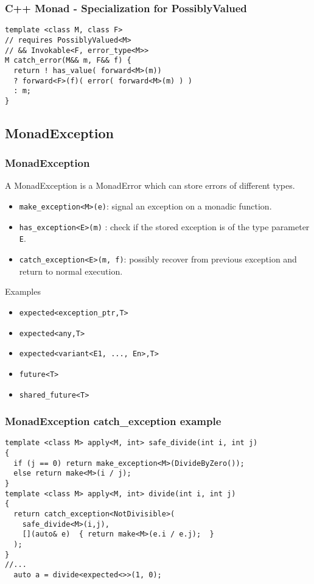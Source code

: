 \documentclass[xcolor=dvipsnames]{beamer}
\newcommand{\cpp}[1]{\lstinline{#1}}
\begin{document}
\begin{frame}[fragile]
\frametitle{C++ Monad - Specialization for PossiblyValued}
       
\begin{lstlisting}
template <class M, class F>
// requires PossiblyValued<M> 
// && Invokable<F, error_type<M>>
M catch_error(M&& m, F&& f) {
  return ! has_value( forward<M>(m))
  ? forward<F>(f)( error( forward<M>(m) ) )
  : m;
}
\end{lstlisting}
         
\end{frame}
\subsection{MonadException}
\begin{frame}[fragile]
\frametitle{MonadException}

A MonadException is a MonadError which can store errors of different types.

\begin{itemize}
  \item \cpp{make_exception<M>(e)}: signal an exception on a monadic function.
  \item \cpp{has_exception<E>(m)} : check if the stored exception is of the type parameter \cpp{E}.
  \item \cpp{catch_exception<E>(m, f)}: possibly recover from previous exception and return to normal execution.
\end{itemize}

Examples
\begin{itemize}
  \item \cpp{expected<exception_ptr,T>} 
  \item \cpp{expected<any,T>} 
  \item \cpp{expected<variant<E1, ..., En>,T>} 
  \item \cpp{future<T>} 
  \item \cpp{shared_future<T>} 
\end{itemize}
\end{frame}
\begin{frame}[fragile]
\frametitle{MonadException catch\_exception example}

\begin{lstlisting}
template <class M> apply<M, int> safe_divide(int i, int j)  
{
  if (j == 0) return make_exception<M>(DivideByZero());
  else return make<M>(i / j);
}
template <class M> apply<M, int> divide(int i, int j)  
{
  return catch_exception<NotDivisible>(
    safe_divide<M>(i,j), 
    [](auto& e)  { return make<M>(e.i / e.j);  }
  );
}
//...
  auto a = divide<expected<>>(1, 0);
\end{lstlisting}
\end{frame}
\end{document}
